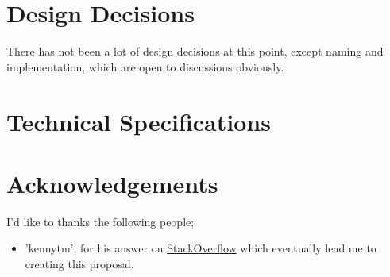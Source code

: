 \section{Design Decisions}
There has not been a lot of design decisions at this point, except naming and
implementation, which are open to discussions obviously.

\section{Technical Specifications}


\section{Acknowledgements}
I'd like to thanks the following people;
\begin{itemize}
\item 'kennytm', for his answer on \href{http://stackoverflow.com/questions/7943525/is-it-possible-to-figure-out-the-parameter-type-and-return-type-of-a-lambda}{StackOverflow} which eventually lead me to creating this proposal.
\end{itemize}
